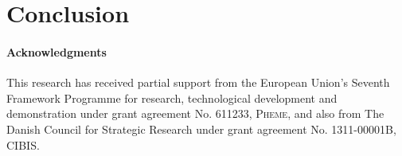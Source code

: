 \documentclass[10pt,a4paper]{article}
\begin{document}
\section{Conclusion}


\paragraph*{Acknowledgments}
This research has received partial support from the European Union’s Seventh Framework Programme for research, technological development and demonstration under grant agreement No. 611233, \textsc{Pheme}, and also from The Danish Council for Strategic Research under grant agreement No. 1311-00001B, \textsc{CIBIS}.

\balance



\end{document}
